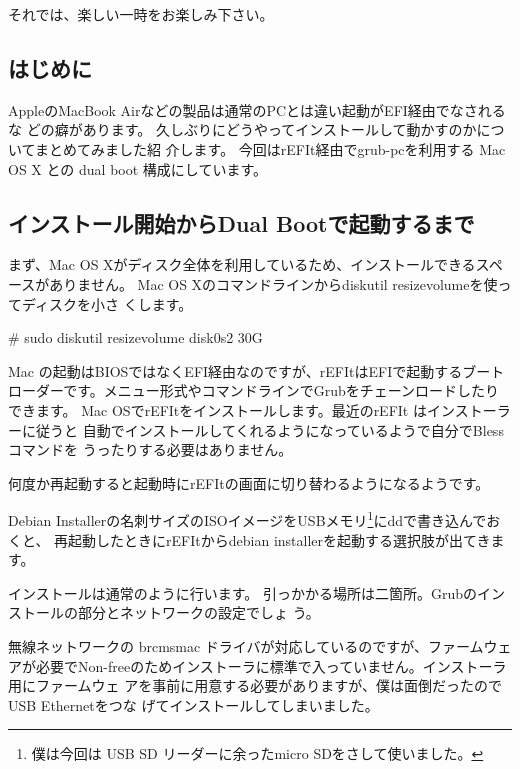 \documentclass[mingoth,a4paper]{jsarticle}
\begin{document}
 それでは、楽しい一時をお楽しみ下さい。


\subsection{はじめに}

AppleのMacBook Airなどの製品は通常のPCとは違い起動がEFI経由でなされるな
どの癖があります。
久しぶりにどうやってインストールして動かすのかについてまとめてみました紹
介します。
今回はrEFIt\cite{refit}経由でgrub-pcを利用する Mac OS X との dual boot 構成にしています。

\subsection{インストール開始からDual Bootで起動するまで}

まず、Mac OS Xがディスク全体を利用しているため、インストールできるスペースがありません。
Mac OS Xのコマンドラインからdiskutil resizevolumeを使ってディスクを小さ
くします。

\begin{commandline}
 # sudo diskutil resizevolume disk0s2 30G 
\end{commandline}

Mac の起動はBIOSではなくEFI経由なのですが、rEFItはEFIで起動するブートローダーです。メニュー形式やコマンドラインでGrubをチェーンロードしたりできます。
Mac OSでrEFItをインストールします。最近のrEFIt はインストーラーに従うと
自動でインストールしてくれるようになっているようで自分でBlessコマンドを
うったりする必要はありません。

何度か再起動すると起動時にrEFItの画面に切り替わるようになるようです。

Debian Installerの名刺サイズのISOイメージをUSBメモリ\footnote{僕は今回は
USB SD リーダーに余ったmicro SDをさして使いました。}にddで書き込んでおくと、
再起動したときにrEFItからdebian installerを起動する選択肢が出てきます。

インストールは通常のように行います。
引っかかる場所は二箇所。Grubのインストールの部分とネットワークの設定でしょ
う。

無線ネットワークの brcmsmac ドライバが対応しているのですが、ファームウェ
アが必要でNon-freeのためインストーラに標準で入っていません。インストーラ用にファームウェ
アを事前に用意する必要がありますが、僕は面倒だったのでUSB Ethernetをつな
げてインストールしてしまいました。
\end{document}
